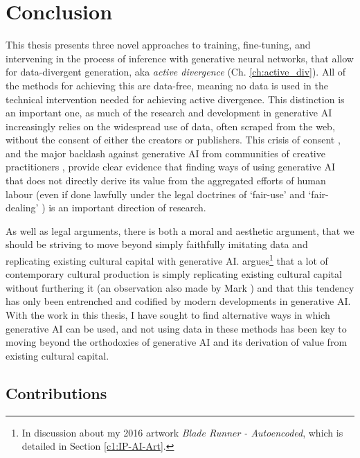 \chapter{Conclusion}
\label{ch:conclusion}

This thesis presents three novel approaches to training, fine-tuning, and intervening in the process of inference with generative neural networks, that allow for data-divergent generation, aka \textit{active divergence} (Ch. \ref{ch:active_div}).
All of the methods for achieving this are data-free, meaning no data is used in the technical intervention needed for achieving active divergence.
This distinction is an important one, as much of the research and development in generative AI increasingly relies on the widespread use of data, often scraped from the web, without the consent of either the creators or publishers.
This crisis of consent \citep{longpre2024consent}, and the major backlash against generative AI from communities of creative practitioners \citep{whiddington2022backlash}, provide clear evidence that finding ways of using generative AI that does not directly derive its value from the aggregated efforts of human labour (even if done lawfully under the legal doctrines of `fair-use' \citep{sobel2017artificial,alhadeff2024limits} and `fair-dealing' \citep{guadamuz2023scanner}) is an important direction of research.

As well as legal arguments, there is both a moral and aesthetic argument, that we should be striving to move beyond simply faithfully imitating data and replicating existing cultural capital with generative AI. 
\cite{rafferty2016future} argues\footnote{In discussion about my 2016 artwork \textit{Blade Runner - Autoencoded}, which is detailed in Section \ref{c1:IP-AI-Art}.} that a lot of contemporary cultural production is simply replicating existing cultural capital without furthering it (an observation also made by Mark \cite{fisher2009capitalist}) and that this tendency has only been entrenched and codified by modern developments in generative AI.
With the work in this thesis, I have sought to find alternative ways in which generative AI can be used, and not using data in these methods has been key to moving beyond the orthodoxies of generative AI and its derivation of value from existing cultural capital.

\section{Contributions}

